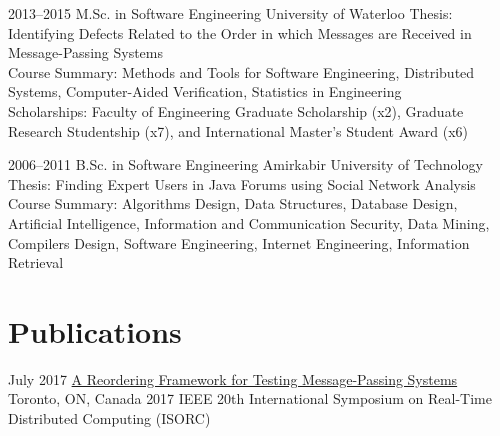\documentclass[]{cv-style}                     %
\begin{document}
\begin{entrylist}

  \entry
  {\small 2013--2015}
  {M.Sc. in Software Engineering {\normalfont [GPA: 87.80/100]}}
  {University of Waterloo}
  {Thesis: Identifying Defects Related to the Order in which Messages are Received in Message-Passing Systems \\
   Course Summary: Methods and Tools for Software Engineering, Distributed Systems, Computer-Aided Verification, Statistics in Engineering \\
   Scholarships: Faculty of Engineering Graduate Scholarship (x2), Graduate Research Studentship (x7), and International Master's Student Award (x6)}

  \entry
  {\small 2006--2011}
  {B.Sc. in Software Engineering {\normalfont [GPA: 16.69/20]}}
  {Amirkabir University of Technology}
  {Thesis: Finding Expert Users in Java Forums using Social Network Analysis \\
   Course Summary: Algorithms Design, Data Structures, Database Design, Artificial Intelligence, Information and Communication Security, Data Mining, Compilers Design, Software Engineering, Internet Engineering, Information Retrieval}

\end{entrylist}



\section{Publications}

\begin{entrylist}

  \entry
  {\small July 2017}
  {\href{http://ieeexplore.ieee.org/abstract/document/7964877}{A Reordering Framework for Testing Message-Passing Systems}}
  {Toronto, ON, Canada}
  {\small{2017 IEEE 20th International Symposium on Real-Time Distributed Computing (ISORC)}}

\end{entrylist}


\end{document}
